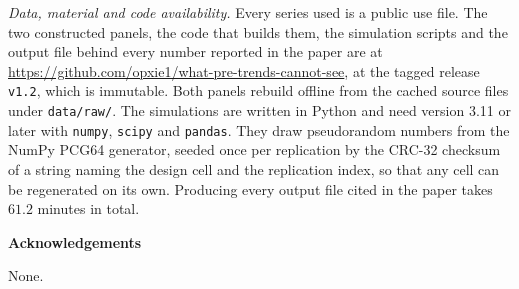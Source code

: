 \documentclass[12pt]{article}
\begin{document}
\smallskip

\noindent\textit{Data, material and code availability.} Every series used is a
public use file. The two constructed panels, the code that builds them, the
simulation scripts and the output file behind every number reported in the
paper are at
\url{https://github.com/opxie1/what-pre-trends-cannot-see}, at the tagged
release \texttt{v1.2}, which is immutable. Both panels rebuild offline from the
cached source files under \texttt{data/raw/}. The simulations are written in
Python and need version 3.11 or later with \texttt{numpy}, \texttt{scipy} and
\texttt{pandas}. They draw pseudorandom numbers from the NumPy PCG64 generator,
seeded once per replication by the CRC-32 checksum of a string naming the design
cell and the replication index, so that any cell can be regenerated on its own.
Producing every output file cited in the paper takes $61.2$ minutes in total.

\vspace{18pt}

\noindent\textbf{Acknowledgements}

\smallskip

\noindent None.
\end{document}
